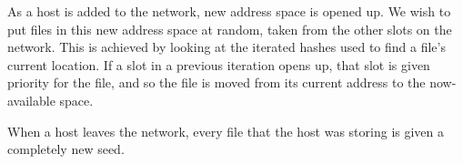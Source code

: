 \documentclass[twocolumn]{article}
\begin{document}
As a host is added to the network, new address space is opened up.
We wish to put files in this new address space at random, taken from the other slots on the network.
This is achieved by looking at the iterated hashes used to find a file's current location.
If a slot in a previous iteration opens up, that slot is given priority for the file, and so the file is moved from its current address to the now-available space.

When a host leaves the network, every file that the host was storing is given a completely new seed.
\fi
\end{document}
